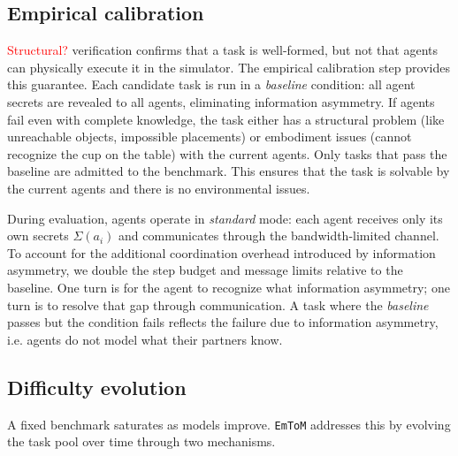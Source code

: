\documentclass{article} %
\newcommand{\g}[1]{\textcolor{red}{#1}}
\newcommand{\shortname}{\texttt{EmToM}}
\begin{document}
\subsection{Empirical calibration}
\label{sec:tom_necessity}

\g{Structural?} verification confirms that a task is well-formed, but not that agents can physically execute it in the simulator. The empirical calibration step provides this guarantee. Each candidate task is run in a \emph{baseline} condition: all agent secrets are revealed to all agents, eliminating information asymmetry. If agents fail even with complete knowledge, the task either has a structural problem (like unreachable objects, impossible placements) or embodiment issues (cannot recognize the cup on the table) with the current agents. Only tasks that pass the baseline are admitted to the benchmark. This ensures that the task is solvable by the current agents and there is no environmental issues. 

During evaluation, agents operate in \emph{standard} mode: each agent receives only its own secrets $\Sigma(a_i)$ and communicates through the bandwidth-limited channel. To account for the additional coordination overhead introduced by information asymmetry, we double the step budget and message limits relative to the baseline. One turn is for the agent to recognize what information asymmetry; one turn is to resolve that gap through communication. A task where the \textit{baseline} passes but the  condition fails reflects the failure due to information asymmetry, i.e. 
agents do not model what their partners know.

\subsection{Difficulty evolution}
\label{sec:calibration}

A fixed benchmark saturates as models improve. \shortname{} addresses this by evolving the task pool over time through two mechanisms.
\end{document}
